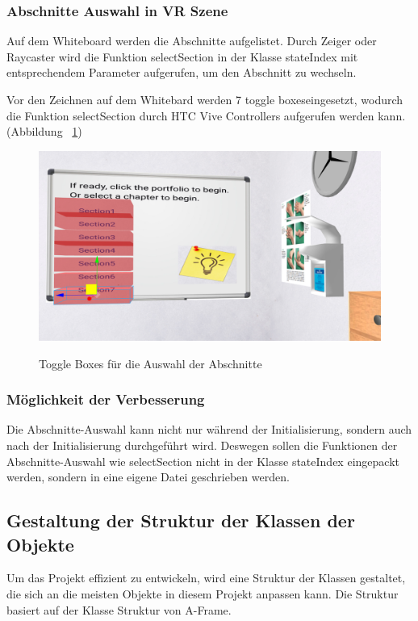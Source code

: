   \subsubsection{Abschnitte Auswahl in VR Szene}
  Auf dem Whiteboard werden die Abschnitte aufgelistet. Durch Zeiger oder Raycaster wird die Funktion {\selectfont selectSection} in der Klasse {\selectfont stateIndex} mit entsprechendem Parameter aufgerufen, um den Abschnitt zu wechseln.
  
  Vor den Zeichnen auf dem Whitebard werden 7 \glqq toggle boxes\grqq eingesetzt, wodurch die Funktion {\selectfont selectSection} durch HTC Vive Controllers aufgerufen werden kann. (Abbildung ~\ref{fig:toggleBoxAbschnitte})
  
\begin{figure}[ht]
\vspace*{1em}
\centering
\caption[Toggle Boxes]{Toggle Boxes für die Auswahl der Abschnitte}
\includegraphics[width=\textwidth]{images/toggleBoxAbschnitte.png}
\label{fig:toggleBoxAbschnitte} 
\end{figure}
  
  \subsubsection{Möglichkeit der Verbesserung}
  Die Abschnitte-Auswahl kann nicht nur während der Initialisierung, sondern auch nach der Initialisierung durchgeführt wird. Deswegen sollen die Funktionen der Abschnitte-Auswahl wie {\selectfont selectSection} nicht in der Klasse {\selectfont stateIndex} eingepackt werden, sondern in eine eigene Datei geschrieben werden.
  
 \subsection{Gestaltung der Struktur der Klassen der Objekte}
 Um das Projekt effizient zu entwickeln, wird eine Struktur der Klassen gestaltet, die sich an die meisten Objekte in diesem Projekt anpassen kann. Die Struktur basiert auf der Klasse Struktur von A-Frame.
 
